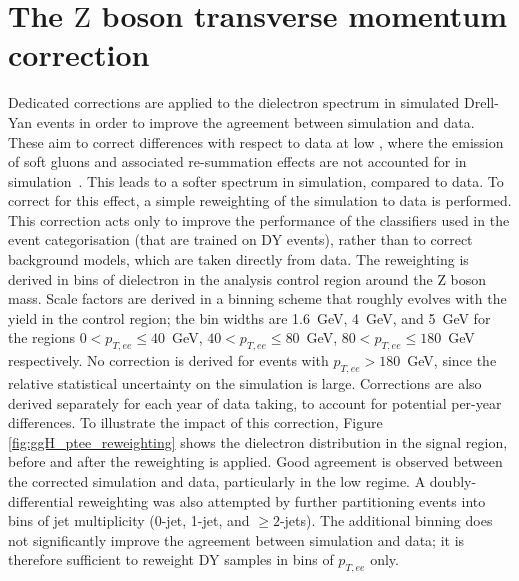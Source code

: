 \chapter{The $\mathrm{Z}$ boson transverse momentum correction}

Dedicated corrections are applied to the dielectron \pt spectrum in simulated Drell-Yan events in order to improve the agreement between simulation and data. These aim to correct differences with respect to data at low \pt, where the emission of soft gluons and associated re-summation effects are not accounted for in simulation~\cite{dy_pt_mismodelling}.
This leads to a softer \pt spectrum in simulation, compared to data. %
To correct for this effect, a simple reweighting of the simulation to data is performed. This correction acts only to improve the performance of the classifiers used in the event categorisation (that are trained on DY events), rather than to correct background models, which are taken directly from data. The reweighting is derived in bins of dielectron \pt in the analysis control region around the Z boson mass. Scale factors are derived in a binning scheme that roughly evolves with the yield in the control region; the bin widths are 1.6~GeV, 4~GeV, and 5~GeV for the regions $0 < p_{T,ee} \leq 40$~GeV, $40< p_{T,ee} \leq 80$~GeV, $80< p_{T,ee} \leq 180$~GeV respectively. No correction is derived for events with $p_{T,ee} > 180$~GeV, since the relative statistical uncertainty on the simulation is large. Corrections are also derived separately for each year of data taking, to account for potential per-year differences. To illustrate the impact of this correction, Figure \ref{fig:ggH_ptee_reweighting} shows the dielectron \pt distribution in the signal region, before and after the \pt reweighting is applied. Good agreement is observed between the corrected simulation and data, particularly in the low \pt regime. A doubly-differential reweighting was also attempted by further partitioning events into bins of jet multiplicity (0-jet, 1-jet, and $\geq2$-jets). The additional binning does not significantly improve the agreement between simulation and data; it is therefore sufficient to reweight DY samples in bins of $p_{T,ee}$ only.

